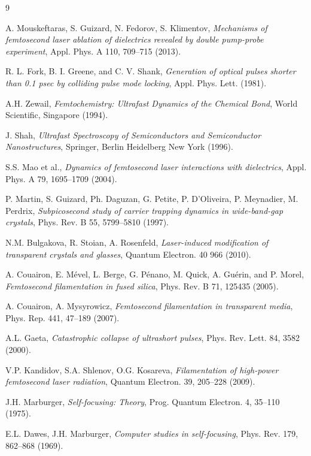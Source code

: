 \begin{thebibliography}{9}

A. Mouskeftaras, S. Guizard, N. Fedorov, S. Klimentov,
\textit{Mechanisms of femtosecond laser ablation of dielectrics revealed by double pump-probe experiment},
Appl. Phys. A 110, 709--715 (2013).

R. L. Fork, B. I. Greene, and C. V. Shank,
\textit{Generation of optical pulses shorter than 0.1 psec by colliding pulse mode locking},
Appl. Phys. Lett. (1981).

A.H. Zewail, 
\textit{Femtochemistry: Ultrafast Dynamics of the Chemical Bond},
World Scientific, Singapore (1994).

J. Shah, 
\textit{Ultrafast Spectroscopy of Semiconductors and Semiconductor Nanostructures},
Springer, Berlin Heidelberg New York (1996).

S.S. Mao et al.,
\textit{Dynamics of femtosecond laser interactions with dielectrics},
Appl. Phys. A 79, 1695--1709 (2004).

P. Martin, S. Guizard, Ph. Daguzan, G. Petite, P. D'Oliveira, P. Meynadier, M. Perdrix,
\textit{Subpicosecond study of carrier trapping dynamics in wide-band-gap crystals},
Phys. Rev. B 55, 5799--5810 (1997).

N.M. Bulgakova, R. Stoian, A. Rosenfeld,
\textit{Laser-induced modification of transparent crystals and glasses},
Quantum Electron. 40 966 (2010).

A. Couairon, E. Mével, L. Berge, G. Pénano, M. Quick, A. Guérin, and P. Morel,
\textit{Femtosecond filamentation in fused silica},
Phys. Rev. B 71, 125435 (2005).

A. Couairon, A. Mysyrowicz,
\textit{Femtosecond filamentation in transparent media},
Phys. Rep. 441, 47--189 (2007).

A.L. Gaeta,
\textit{Catastrophic collapse of ultrashort pulses},
Phys. Rev. Lett. 84, 3582 (2000).

V.P. Kandidov, S.A. Shlenov, O.G. Kosareva,
\textit{Filamentation of high-power femtosecond laser radiation},
Quantum Electron. 39, 205--228 (2009).

J.H. Marburger,
\textit{Self-focusing: Theory},
Prog. Quantum Electron. 4, 35--110 (1975).

E.L. Dawes, J.H. Marburger,
\textit{Computer studies in self-focusing},
Phys. Rev. 179, 862--868 (1969).


\end{thebibliography}
